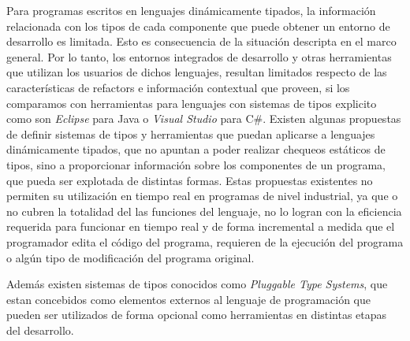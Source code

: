 \documentclass[a4paper,10pt]{article}
\begin{document}
Para programas escritos en lenguajes dinámicamente tipados, la información relacionada con los tipos de cada componente que puede obtener un entorno de desarrollo es limitada. Esto es consecuencia de la situación descripta en el marco general.
Por lo tanto, los entornos integrados de desarrollo y otras herramientas que utilizan los usuarios de dichos lenguajes, resultan limitados respecto de las características de refactors e información contextual que proveen, si los comparamos con herramientas para lenguajes con sistemas de tipos explicito como son \emph{Eclipse} para Java o \emph{Visual Studio} para C\#. 
Existen algunas propuestas de definir sistemas de tipos y herramientas que puedan aplicarse a lenguajes dinámicamente tipados, que no apuntan a poder realizar chequeos estáticos de tipos, sino a proporcionar información sobre los componentes de un programa, que pueda ser explotada de distintas formas. Estas propuestas existentes no permiten su utilización en tiempo real en programas de nivel industrial, ya que o no cubren la totalidad del las funciones del lenguaje\cite{Pluq09a,Wang01a,Pluq09a}, no lo logran con la eficiencia requerida para funcionar en tiempo real\cite{Ages96a,Spoo05a,Oxho92a} y de forma incremental a medida que el programador edita el código del programa, requieren de la ejecución del programa\cite{Haup11a} o algún tipo de modificación del programa original\cite{Grav90a,Alle13a}.

Además existen sistemas de tipos conocidos como \emph{Pluggable Type Systems}\cite{Brac04a}, que estan concebidos como elementos externos al lenguaje de programación que pueden ser utilizados de forma opcional como herramientas en distintas etapas del desarrollo.
\end{document}
